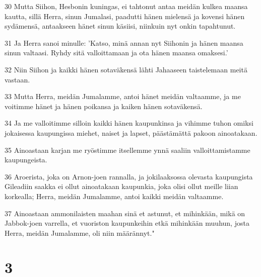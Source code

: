 \par 30 Mutta Siihon, Hesbonin kuningas, ei tahtonut antaa meidän kulkea maansa kautta, sillä Herra, sinun Jumalasi, paadutti hänen mielensä ja kovensi hänen sydämensä, antaakseen hänet sinun käsiisi, niinkuin nyt onkin tapahtunut.
\par 31 Ja Herra sanoi minulle: 'Katso, minä annan nyt Siihonin ja hänen maansa sinun valtaasi. Ryhdy sitä valloittamaan ja ota hänen maansa omaksesi.'
\par 32 Niin Siihon ja kaikki hänen sotaväkensä lähti Jahaaseen taistelemaan meitä vastaan.
\par 33 Mutta Herra, meidän Jumalamme, antoi hänet meidän valtaamme, ja me voitimme hänet ja hänen poikansa ja kaiken hänen sotaväkensä.
\par 34 Ja me valloitimme silloin kaikki hänen kaupunkinsa ja vihimme tuhon omiksi jokaisessa kaupungissa miehet, naiset ja lapset, päästämättä pakoon ainoatakaan.
\par 35 Ainoastaan karjan me ryöstimme itsellemme ynnä saaliin valloittamistamme kaupungeista.
\par 36 Aroerista, joka on Arnon-joen rannalla, ja jokilaaksossa olevasta kaupungista Gileadiin saakka ei ollut ainoatakaan kaupunkia, joka olisi ollut meille liian korkealla; Herra, meidän Jumalamme, antoi kaikki meidän valtaamme.
\par 37 Ainoastaan ammonilaisten maahan sinä et astunut, et mihinkään, mikä on Jabbok-joen varrella, et vuoriston kaupunkeihin etkä mihinkään muuhun, josta Herra, meidän Jumalamme, oli niin määrännyt."

\chapter{3}

